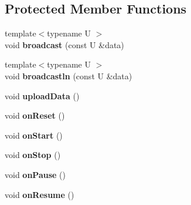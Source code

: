 \subsection*{Protected Member Functions}
\begin{DoxyCompactItemize}
\item 
\mbox{\label{classwood_box_1_1module_1_1_wood_box_module_ac481cbb3ee83f192218a5943c59d74fe}} 
{\footnotesize template$<$typename U $>$ }\\void {\bfseries broadcast} (const U \&data)
\item 
\mbox{\label{classwood_box_1_1module_1_1_wood_box_module_a5329c737b0a102851782b5d2a6019bc8}} 
{\footnotesize template$<$typename U $>$ }\\void {\bfseries broadcastln} (const U \&data)
\item 
\mbox{\label{classwood_box_1_1module_1_1_wood_box_module_a4fa136e3e3f29c71d12a8163b4c5a765}} 
void {\bfseries upload\+Data} ()
\item 
\mbox{\label{classwood_box_1_1module_1_1_wood_box_module_a5e6a48a192f53fa5d739ec40153e3af4}} 
void {\bfseries on\+Reset} ()
\item 
\mbox{\label{classwood_box_1_1module_1_1_wood_box_module_a96620d9bbbb5ad60347aac340dee6892}} 
void {\bfseries on\+Start} ()
\item 
\mbox{\label{classwood_box_1_1module_1_1_wood_box_module_a5897df7845ffc3b9d0ec8394e10a2ff2}} 
void {\bfseries on\+Stop} ()
\item 
\mbox{\label{classwood_box_1_1module_1_1_wood_box_module_a55bfd3c23c7be2b757db22b3db7d1bc5}} 
void {\bfseries on\+Pause} ()
\item 
\mbox{\label{classwood_box_1_1module_1_1_wood_box_module_ac6c8420f517a8ce3acf98ceda5827bac}} 
void {\bfseries on\+Resume} ()
\item 

\end{DoxyCompactItemize}
